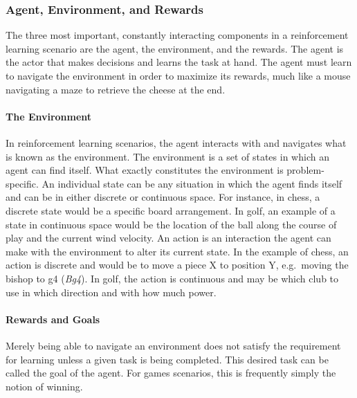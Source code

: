 \subsubsection*{Agent, Environment, and Rewards}


The three most important, constantly interacting components in a reinforcement
learning scenario are
the agent, the environment, and the rewards.
%
The agent is the actor that makes decisions and learns the task at hand.
%
The agent must learn to navigate the environment in order to maximize its
rewards,
much like a mouse navigating a maze to retrieve the cheese at the end.

\paragraph*{The Environment}

In reinforcement learning scenarios,
the agent interacts with and navigates what is known as the environment.
%
The environment is a set of states in which an agent can find itself.
%
What exactly constitutes the environment is problem-specific.
%
An individual state can be any situation in which the agent finds itself
and can be in either discrete or continuous space.
%
For instance, in chess, a discrete state would be a specific board arrangement.
%
In golf, an example of a state in continuous space would be 
the location of the ball along the course of play
and the current wind velocity.
%
An action is an interaction the agent can make with the environment to alter
its current state.
%
In the example of chess,
an action is discrete and would be to move a piece X to position Y,
e.g.\  moving the bishop to g4 (\textit{Bg4}).
%
In golf, the action is continuous and may be
which club to use in which direction and with how much power.

\paragraph*{Rewards and Goals}

Merely being able to navigate an environment does not satisfy the
requirement for learning unless a given task is being completed.
%
This desired task can be called the goal of the agent.
%
For games scenarios,
this is frequently simply the notion of winning.

